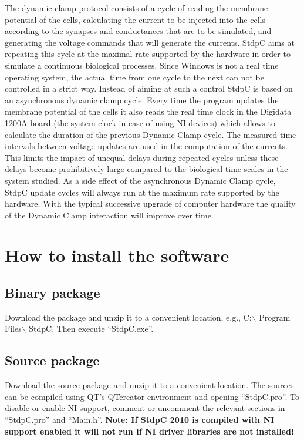 \documentclass{article}
\begin{document}
The dynamic clamp protocol consists of a cycle of reading the membrane
potential of the cells, calculating the current to be injected into
the cells according to the synapses and conductances that are to be
simulated, and generating the voltage commands that will generate the
currents. StdpC aims at repeating this cycle at the maximal rate
supported by the hardware in order to simulate a continuous biological
processes. Since Windows is not a real time operating system, the
actual time from one cycle to the next can not be controlled in a
strict way. Instead of aiming at such a control StdpC is based on an
asynchronous dynamic clamp cycle.  Every time the program updates the
membrane potential of the cells it also reads the real time clock in
the Digidata 1200A board (the system clock in case of using NI
devices) which allows to calculate the duration of the previous
Dynamic Clamp cycle. The measured time intervals between voltage
updates are used in the computation of the currents. This limits the
impact of unequal delays during repeated cycles unless these delays
become prohibitively large compared to the biological time scales in the system
studied. As a side effect of the asynchronous Dynamic Clamp cycle,
StdpC update cycles will always run at the maximum rate supported by
the hardware. With the typical successive upgrade of computer hardware
the quality of the Dynamic Clamp interaction will improve over time.

\section{How to install the software}

\subsection{Binary package}
Download the package and unzip it to a convenient location, e.g.,
C:$\backslash$ Program Files$\backslash$ StdpC. Then execute ``StdpC.exe''.

\subsection{Source package}
Download the source package and unzip it to a convenient
location. The sources can be compiled using QT's QTcreator
environment and opening ``StdpC.pro''. To disable or enable NI
support, comment or uncomment the relevant sections in ``StdpC.pro''
and ``Main.h''. {\bf Note: If StdpC 2010 is compiled with NI support
  enabled it will not run if NI driver libraries are not installed!}
\end{document}
